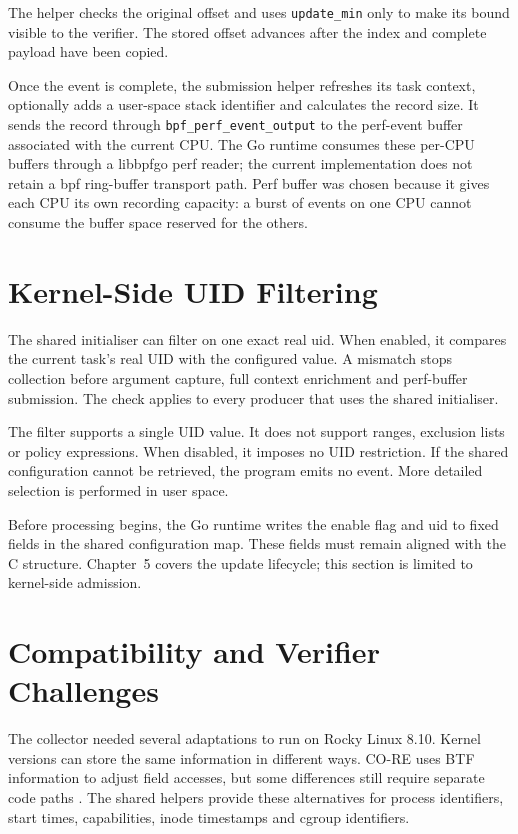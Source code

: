 The helper checks the original offset and uses \texttt{update\_min} only to make
its bound visible to the verifier. The stored offset advances after the index
and complete payload have been copied.

Once the event is complete, the submission helper refreshes its task context,
optionally adds a user-space stack identifier and calculates the record size.
It sends the record through
\texttt{\gls{bpf}\_perf\_event\_output} to the perf-event buffer associated with the
current CPU. The Go runtime consumes these per-CPU buffers through a libbpfgo
perf reader; the current implementation does not retain a \gls{bpf} ring-buffer
transport path. Perf buffer was chosen because it gives each CPU its own recording capacity: a burst of
events on one CPU cannot consume the buffer space reserved for the others.

\section{Kernel-Side UID Filtering}
\label{sec:implementation-selection-filtering}

The shared initialiser can filter on one exact real \gls{uid}. When enabled,
it compares the current task's real UID with the configured value. A mismatch
stops collection before argument capture, full context enrichment and
perf-buffer submission. The check applies to every producer that uses the
shared initialiser.

The filter supports a single UID value. It does not support ranges,
exclusion lists or policy expressions. When disabled, it imposes no UID
restriction. If the shared configuration cannot be retrieved, the program
emits no event. More detailed selection is performed in user space.

Before processing begins, the Go runtime writes the enable flag and \gls{uid} to
fixed fields in the shared configuration map. These fields must remain aligned
with the C structure. Chapter~5 covers the update lifecycle; this section is
limited to kernel-side admission.

\section{Compatibility and Verifier Challenges}
\label{sec:implementation-compatibility-verifier}

The collector needed several adaptations to run on Rocky Linux 8.10.
Kernel versions can store the same information in different ways.
CO-RE uses BTF information to adjust field accesses, but some differences
still require separate code paths \cite{linux_btf,linux_libbpf_overview}.
The shared helpers provide these alternatives for process identifiers,
start times, capabilities, inode timestamps and cgroup identifiers.

